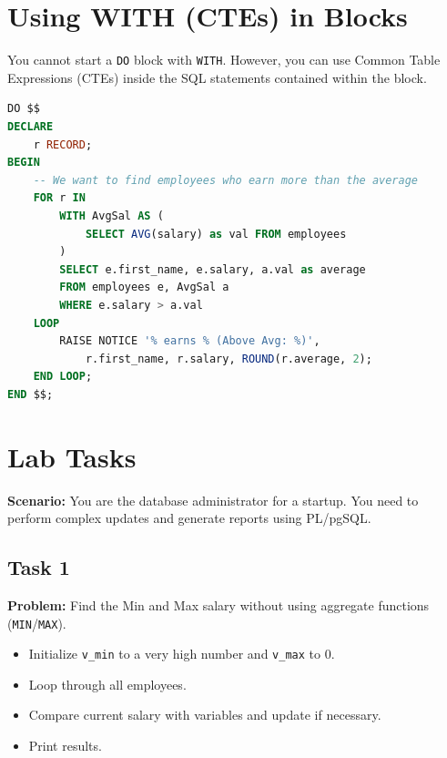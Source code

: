 \documentclass[12pt,a4paper]{article}
\begin{document}
\newpage
\section{Using WITH (CTEs) in Blocks}

You cannot start a \texttt{DO} block with \texttt{WITH}. However, you can use Common Table Expressions (CTEs) inside the SQL statements contained within the block.

\begin{lstlisting}[language=SQL, caption={CTE inside Anonymous Block}]
DO $$ 
DECLARE
    r RECORD;
BEGIN
    -- We want to find employees who earn more than the average
    FOR r IN 
        WITH AvgSal AS (
            SELECT AVG(salary) as val FROM employees
        )
        SELECT e.first_name, e.salary, a.val as average
        FROM employees e, AvgSal a
        WHERE e.salary > a.val
    LOOP
        RAISE NOTICE '% earns % (Above Avg: %)', 
            r.first_name, r.salary, ROUND(r.average, 2);
    END LOOP;
END $$;
\end{lstlisting}

\newpage
\section{Lab Tasks}

\textbf{Scenario:} You are the database administrator for a startup. You need to perform complex updates and generate reports using PL/pgSQL.


\subsection*{Task 1}
\textbf{Problem:} Find the Min and Max salary without using aggregate functions (\texttt{MIN}/\texttt{MAX}).
\begin{itemize}
    \item Initialize \texttt{v\_min} to a very high number and \texttt{v\_max} to 0.
    \item Loop through all employees.
    \item Compare current salary with variables and update if necessary.
    \item Print results.
\end{itemize}
\end{document}
